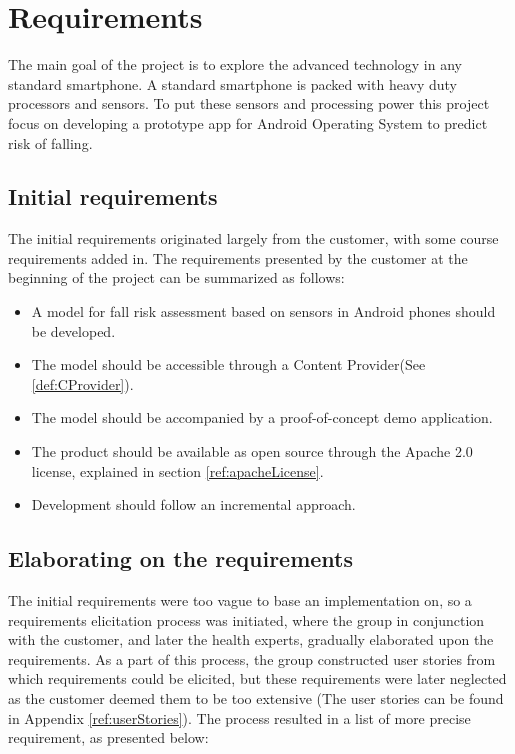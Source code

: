 \chapter{Requirements}

The main goal of the project is to explore the advanced technology in any standard smartphone. A standard smartphone is packed with heavy duty processors and sensors. To put these sensors and processing power this project focus on developing a prototype app for Android Operating System to predict risk of falling. 

\section{Initial requirements}
The initial requirements originated largely from the customer, with some course requirements added in. The requirements presented by the customer at the beginning of the project can be summarized as follows:

\begin{itemize}
\item A model for fall risk assessment based on sensors in Android phones should be developed.
\item The model should be accessible through a Content Provider(See \ref{def:CProvider}).
\item The model should be accompanied by a proof-of-concept demo application.
\item The product should be available as open source through the Apache 2.0 license, explained in section \ref{ref:apacheLicense}.
\item Development should follow an incremental approach.
\end{itemize}

\section{Elaborating on the requirements}
\label{elaboratingrequirements}
The initial requirements were too vague to base an implementation on, so a requirements elicitation process was initiated, where the group in conjunction with the customer, and later the health experts, gradually elaborated upon the requirements. As a part of this process, the group constructed user stories from which requirements could be elicited, but these requirements were later neglected as the customer deemed them to be too extensive (The user stories can be found in Appendix \ref{ref:userStories}). The process resulted in a list of more precise requirement, as presented below:


